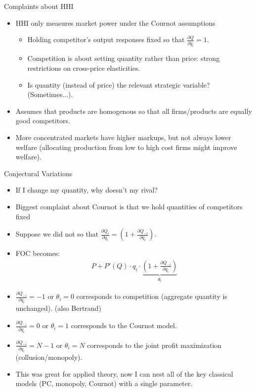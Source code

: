 \documentclass[xcolor=pdftex,dvipsnames,table,mathserif,aspectratio=169]{beamer}
\begin{document}
\begin{frame}{Complaints about HHI}
\begin{itemize}
\item HHI only measures market power under the Cournot assumptions
\begin{itemize}
\item Holding competitor's output responses fixed so that $\frac{\partial Q}{\partial q_i} =1$.
\item Competition is about setting quantity rather than price: strong restrictions on cross-price elasticities.
\item Is quantity (instead of price) the relevant strategic variable? (Sometimes...).
\end{itemize}
\item Assumes that products are \alert{homogenous} so that all firms/products are equally good competitors.
\item More concentrated markets have higher markups, but not always lower welfare (allocating production from low to high cost firms might improve welfare).
\end{itemize}
\end{frame}

\begin{frame}{Conjectural Variations}
\begin{itemize}
\item If I change my quantity, why doesn't my rival?
\item Biggest complaint about Cournot is that we hold quantities of competitors fixed
\item Suppose we did not so that $\frac{\partial Q_i}{\partial q_i} = (1 + \frac{\partial Q_{-i}}{\partial q_i}).$
\item FOC becomes:
\begin{eqnarray*}
P + P'(Q) \cdot q_i \cdot \underbrace{\left(1+ \frac{\partial Q_{-i}}{\partial q_i} \right)}_{\theta_i}
\end{eqnarray*}
\item $\frac{\partial Q_{-i}}{\partial q_i} =-1$  or $\theta_i =0$ corresponds to competition (aggregate quantity is unchanged). (also Bertrand)
\item $\frac{\partial Q_{-i}}{\partial q_i} =0$ or $\theta_i = 1$ corresponds to the Cournot model.
\item $\frac{\partial Q_{-i}}{\partial q_i} =N-1$ or $\theta_i = N$ corresponds to the joint profit maximization (collusion/monopoly).
\item This was great for applied theory, now I can nest all of the key classical models (PC, monopoly, Cournot) with a single parameter.
\end{itemize}
\end{frame}
\end{document}
